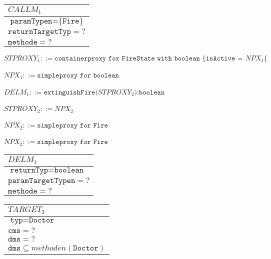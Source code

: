 \documentclass[a4paper,12pt]{article}
\begin{document}
\begin{table}[H]
\begin{tabular}{|l|}
\hline
\cellcolor{yellow}$\mathit{CALLM_1}$\\
\hline
$\texttt{paramTypen} = \text{\{}\texttt{Fire}\text{\}}$\\
$\texttt{returnTargetTyp} = ?$\\
$\texttt{methode} = ?$\\
\hline
\end{tabular}
\end{table}
$\mathit{STPROXY_1} ::= \texttt{containerproxy for FireState with boolean \{ isActive = }\mathit{NPX_1}\texttt{\{}$
\\\\
$\mathit{NPX_1} ::= \texttt{simpleproxy for boolean}$
\\\\
$\mathit{DELM_1} ::= \texttt{extinguishFire(}\mathit{STPROXY_2}\texttt{):boolean}$
\\\\
$\mathit{STPROXY_2} ::= \mathit{NPX_2}$
\\\\
$\mathit{NPX_2} ::= \texttt{simpleproxy for Fire}$
\\\\
$\mathit{NPX_2} ::= \texttt{simpleproxy for Fire}$





\begin{table}[H]
\begin{tabular}{|l|}
\hline
\cellcolor{yellow}$\mathit{DELM_1}$\\
\hline
$\texttt{returnTyp} = \texttt{boolean}$\\
$\texttt{paramTargetTypen} = ?$\\
$\texttt{methode} = ?$\\
\hline
\end{tabular}
\end{table}





\begin{table}[H]
\begin{tabular}{|l|}
\hline
\cellcolor{yellow}$\mathit{TARGET_2}$\\
\hline
$\texttt{typ} = \texttt{Doctor}$\\
$\texttt{cms} = ?$\\
$\texttt{dms} = ?$\\
\hline
$\texttt{dms} \subseteq \mathit{methoden(\texttt{Doctor})}$\\
\hline
\end{tabular}
\end{table}
\end{document}
